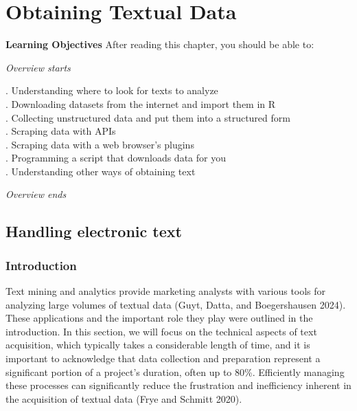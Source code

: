 \chapter{Obtaining Textual Data}\label{obtaining-textual-data}

\textbf{Learning Objectives} After reading this chapter, you should be
able to:

\emph{Overview starts}

. Understanding where to look for texts to analyze\\
. Downloading datasets from the internet and import them in R\\
. Collecting unstructured data and put them into a structured form\\
. Scraping data with APIs\\
. Scraping data with a web browser's plugins\\
. Programming a script that downloads data for you\\
. Understanding other ways of obtaining text

\emph{Overview ends}

\section{Handling electronic text}\label{handling-electronic-text}

\subsection{Introduction}\label{introduction-1}

Text mining and analytics provide marketing analysts with various tools for
analyzing large volumes of textual data (Guyt, Datta, and Boegershausen
2024). These applications and the important role they play were 
outlined in the introduction. In this section, we will focus on
the technical aspects of text acquisition, which typically takes a 
considerable length of time, and it is important to acknowledge that data
collection and preparation represent a significant portion of a
project's duration, often up to 80\%. Efficiently managing these
processes can significantly reduce the frustration and inefficiency inherent in the acquisition of textual data (Frye
and Schmitt 2020).


